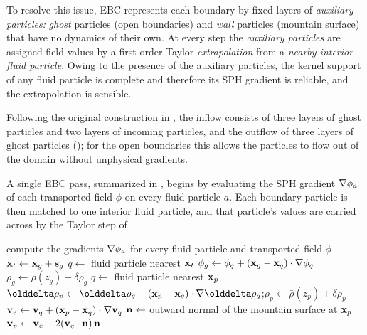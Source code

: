 \documentclass[../main.tex]{subfiles}
\begin{document}
To resolve this issue, EBC represents each boundary by fixed layers of \emph{auxiliary particles:} \emph{ghost} particles (open boundaries) and \emph{wall} particles (mountain surface) that have no dynamics of their own. At every step the \emph{auxiliary particles} are assigned field values by a first-order Taylor \emph{extrapolation} from a \emph{nearby interior fluid particle}. Owing to the presence of the auxiliary particles, the kernel support of any fluid particle is complete and therefore its SPH gradient is reliable, and the extrapolation is sensible.

Following the original construction in \autocite{mahdizadehExtrapolationBoundaryConditions2025}, the inflow consists of three layers of ghost particles and two layers of incoming particles, and the outflow of three layers of ghost particles (); for the open boundaries this allows the particles to flow out of the domain without unphysical gradients.

A single EBC pass, summarized in , begins by evaluating the SPH gradient $\nabla \phi_a$ of each transported field $\phi$ on every fluid particle $a$. Each boundary particle is then matched to one interior fluid particle, and that particle's values are carried across by the Taylor step of .

\begin{algorithm}
	\caption{One extrapolation boundary condition pass, applied each time step.}
	\label{alg:EBC}
	\begin{algobox}
	\begin{algorithmic}[1]
			\State compute the gradients $\nabla\phi_a$ for every fluid particle and transported field $\phi$
			 
				\State $\mathbf{x}_t \gets \mathbf{x}_g + \mathbf{s}_g$ 
				\State $q \gets$ fluid particle nearest $\mathbf{x}_t$
				\State $\phi_g \gets \phi_q + (\mathbf{x}_g - \mathbf{x}_q)\cdot\nabla\phi_q$ 
\State $\rho_g \gets \bar{\rho}(z_g) + \delta\rho_g$ 
			\EndFor
			 
				\State $q \gets$ fluid particle nearest $\mathbf{x}_p$
\State $\delta\rho_p \gets \delta\rho_q + (\vb{x}_p - \vb{x}_q)\cdot\grad\delta\rho_q$;\quad $\rho_p \gets \bar{\rho}(z_p) + \delta\rho_p$
				\State $\mathbf{v}_e \gets \mathbf{v}_q + (\mathbf{x}_p - \mathbf{x}_q)\cdot\nabla\mathbf{v}_q$ 
				\State $\mathbf{n} \gets$ outward normal of the mountain surface at $\mathbf{x}_p$
				\State $\mathbf{v}_p \gets \mathbf{v}_e - 2(\mathbf{v}_e\cdot\mathbf{n})\,\mathbf{n}$ 
			\EndFor
		\EndProcedure
	\end{algorithmic}
	\end{algobox}
\end{algorithm}
\end{document}
